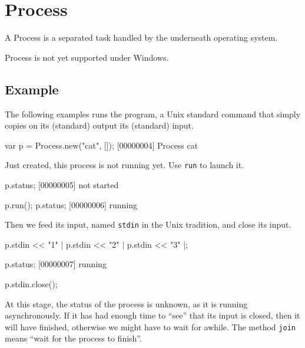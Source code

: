 
\section{Process}

A Process is a separated task handled by the underneath operating
system.

\begin{windows}
  Process is not yet supported under Windows.
\end{windows}

\subsection{Example}

The following examples runs the  program, a Unix standard
command that simply copies on its (standard) output its (standard)
input.

\begin{urbiscript}
var p = Process.new("cat", []);
[00000004] Process cat
\end{urbiscript}

\noindent
Just created, this process is not running yet.  Use \lstinline|run| to
launch it.

\begin{urbiscript}
p.status;
[00000005] not started

p.run();
p.status;
[00000006] running
\end{urbiscript}

\noindent
Then we feed its input, named \lstinline|stdin| in the Unix
tradition, and close its input.

\begin{urbiscript}
p.stdin << "1\n" |
p.stdin << "2\n" |
p.stdin << "3\n" |;

p.status;
[00000007] running

p.stdin.close();
\end{urbiscript}

\noindent
At this stage, the status of the process is unknown, as it is running
asynchronously.  If it has had enough time to ``see'' that its input
is closed, then it will have finished, otherwise we might have to wait
for awhile.  The method \lstinline|join| means ``wait for the process
to finish''.

